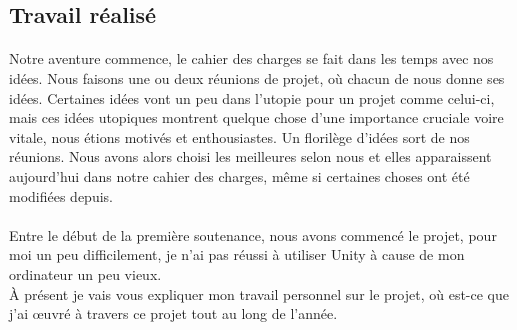\documentclass[titlepage, 13px, a4paper]{report}
\begin{document}
\subsection{Travail réalisé}

\paragraph*{} \hspace{0pt}
Notre aventure commence, le cahier des charges se fait dans les temps avec nos idées. Nous faisons une 
ou deux réunions de projet, où chacun de nous donne ses idées. Certaines idées vont un peu dans l'utopie 
pour un projet comme celui-ci, mais ces idées utopiques montrent quelque chose d'une importance cruciale 
voire vitale, nous étions motivés et enthousiastes. Un florilège d'idées sort de nos réunions. Nous avons 
alors choisi les meilleures selon nous et elles apparaissent aujourd'hui dans notre cahier des charges, 
même si certaines choses ont été modifiées depuis.  \\


\paragraph*{} \hspace{0pt}
Entre le début de la première soutenance, nous avons commencé le projet, pour moi un peu difficilement, 
je n'ai pas réussi à utiliser Unity à cause de mon ordinateur un peu vieux. \\
À présent je vais vous expliquer mon travail 
personnel sur le projet, où est-ce que j’ai œuvré à travers ce projet tout au long de l’année. \\
\end{document}

